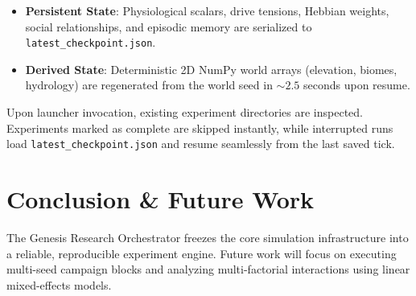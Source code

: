 \documentclass[11pt,a4paper]{article}
\begin{document}
\begin{itemize}
    \item \textbf{Persistent State}: Physiological scalars, drive tensions, Hebbian weights, social relationships, and episodic memory are serialized to \texttt{latest\_checkpoint.json}.
    \item \textbf{Derived State}: Deterministic 2D NumPy world arrays (elevation, biomes, hydrology) are regenerated from the world seed in $\sim 2.5$ seconds upon resume.
\end{itemize}

Upon launcher invocation, existing experiment directories are inspected. Experiments marked as complete are skipped instantly, while interrupted runs load \texttt{latest\_checkpoint.json} and resume seamlessly from the last saved tick.

\section{Conclusion \& Future Work}
The Genesis Research Orchestrator freezes the core simulation infrastructure into a reliable, reproducible experiment engine. Future work will focus on executing multi-seed campaign blocks and analyzing multi-factorial interactions using linear mixed-effects models.
\end{document}
